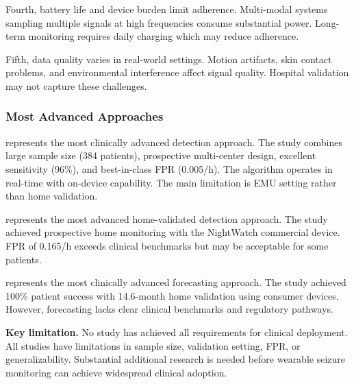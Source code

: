 Fourth, battery life and device burden limit adherence. Multi-modal systems sampling multiple signals at high frequencies consume substantial power. Long-term monitoring requires daily charging which may reduce adherence.

Fifth, data quality varies in real-world settings. Motion artifacts, skin contact problems, and environmental interference affect signal quality. Hospital validation may not capture these challenges.

\subsubsection{Most Advanced Approaches}

\textcite{spahrDeepLearningbasedDetection2025} represents the most clinically advanced detection approach. The study combines large sample size (384 patients), prospective multi-center design, excellent sensitivity (96\%), and best-in-class FPR (0.005/h). The algorithm operates in real-time with on-device capability. The main limitation is EMU setting rather than home validation.

\textcite{dongTwoLayerEnsembleMethod2022} represents the most advanced home-validated detection approach. The study achieved prospective home monitoring with the NightWatch commercial device. FPR of 0.165/h exceeds clinical benchmarks but may be acceptable for some patients.

\textcite{stirlingForecastingSeizureLikelihood2021} represents the most clinically advanced forecasting approach. The study achieved 100\% patient success with 14.6-month home validation using consumer devices. However, forecasting lacks clear clinical benchmarks and regulatory pathways.

\textbf{Key limitation.} No study has achieved all requirements for clinical deployment. All studies have limitations in sample size, validation setting, FPR, or generalizability. Substantial additional research is needed before wearable seizure monitoring can achieve widespread clinical adoption.
